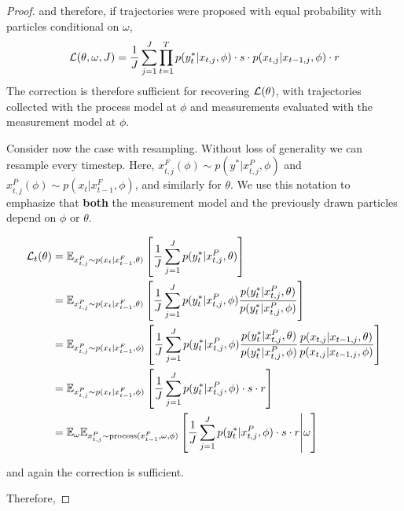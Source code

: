 \documentclass{article}
\begin{document}
\begin{proof}
    and therefore, if trajectories were proposed with equal probability with particles conditional on $\omega$,
    $$ \mathcal{L}(\theta, \omega, J) = \frac{1}{J} \sum_{j=1}^J \prod_{t=1}^T p(y_t^*|x_{t,j}, \phi) \cdot s \cdot p(x_{t,j}|x_{t-1,j}, \phi)\cdot r $$
    The correction is therefore sufficient for recovering $\mathcal{L}(\theta)$, with trajectories collected with the process model at $\phi$ and measurements evaluated with the measurement model at $\phi$. 
    
    Consider now the case with resampling. Without loss of generality we can resample every timestep. Here, $x_{t,j}^F(\phi) \sim p(y^*|x_{t,j}^P, \phi)$ and $x_{t,j}^P(\phi) \sim p(x_t|x_{t-1}^F,\phi)$, and similarly for $\theta$. We use this notation to emphasize that \textbf{both} the measurement model and the previously drawn particles depend on $\phi$ or $\theta$.
    
    \begin{align*}
        \mathcal{L}_t(\theta) &= \mathbb{E}_{x_{t,j}^P \sim p(x_t|x_{t-1}^F, \theta)} \left[\frac{1}{J}\sum_{j=1}^J p(y_t^*|x_{t,j}^P,\theta) \right] \\
        &= \mathbb{E}_{x_{t,j}^P \sim p(x_t|x_{t-1}^F, \theta)} \left[\frac{1}{J}\sum_{j=1}^J p(y_t^*|x_{t,j}^P,\phi) \frac{p(y_t^*|x_{t,j}^P,\theta)}{p(y_t^*|x_{t,j}^P,\phi)} \right] \\
        &= \mathbb{E}_{x_{t,j}^P \sim p(x_t|x_{t-1}^F, \phi)} \left[\frac{1}{J}\sum_{j=1}^J p(y_t^*|x_{t,j}^P,\phi) \frac{p(y_t^*|x_{t,j}^P,\theta)}{p(y_t^*|x_{t,j}^P,\phi)} \frac{p(x_{t,j}|x_{t-1,j}, \theta) }{p(x_{t,j}|x_{t-1,j}, \phi) }\right] \\
        &= \mathbb{E}_{x_{t,j}^P \sim p(x_t|x_{t-1}^F, \phi)} \left[\frac{1}{J}\sum_{j=1}^J p(y_t^*|x_{t,j}^P,\phi) \cdot s \cdot r \right] \\
        &= \mathbb{E}_{\omega}\mathbb{E}_{x_{t,j}^P \sim \text{process}(x_{t-1}^F, \omega, \phi)} \left[\frac{1}{J}\sum_{j=1}^J p(y_t^*|x_{t,j}^P,\phi) \cdot s \cdot r \middle| \omega \right]
    \end{align*}
    
    and again the correction is sufficient.

    Therefore,


\end{proof}
\end{document}
